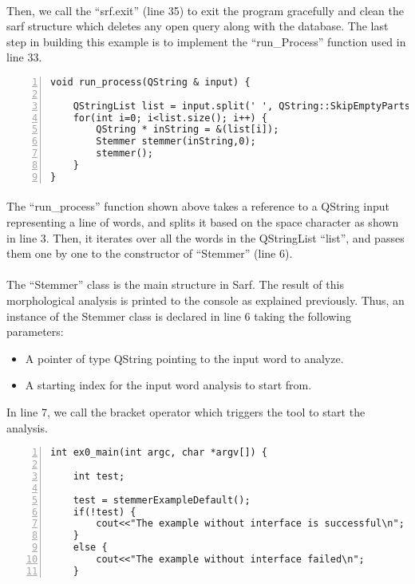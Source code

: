 \documentclass{article}
\begin{document}
\paragraph{}
Then,  we call the ``srf.exit'' (line 35) to exit the program gracefully and clean the sarf structure which deletes any open query along with the database. The last step in building this example is to implement the ``run\_Process'' function used in line 33.

\begin{Verbatim}[numbers=left]
void run_process(QString & input) {

    QStringList list = input.split(' ', QString::SkipEmptyParts);
    for(int i=0; i<list.size(); i++) {
        QString * inString = &(list[i]);
        Stemmer stemmer(inString,0);
        stemmer();
    }
}
\end{Verbatim}

\paragraph{}
The ``run\_process'' function shown above takes a reference to a QString input representing a line of words, and splits it based on the space character as shown in line 3. Then, it iterates over all the words in the QStringList ``list'', and passes them one by one to the constructor of ``Stemmer'' (line 6).

\paragraph{}
The ``Stemmer'' class is the main structure in Sarf. The result of this morphological analysis is printed to the console as explained previously. Thus, an instance of the Stemmer class is declared in line 6 taking the following parameters:
\begin{itemize}
\item A pointer of type QString pointing to the input word to analyze.
\item A starting index for the input word analysis to start from.
\end{itemize}
In line 7, we call the bracket operator which triggers the tool to start the analysis.

\begin{Verbatim}[numbers=left]
int ex0_main(int argc, char *argv[]) {

    int test;
    
    test = stemmerExampleDefault();
    if(!test) {
        cout<<"The example without interface is successful\n";
    }
    else {
        cout<<"The example without interface failed\n";
    }
\end{Verbatim}
\end{document}
